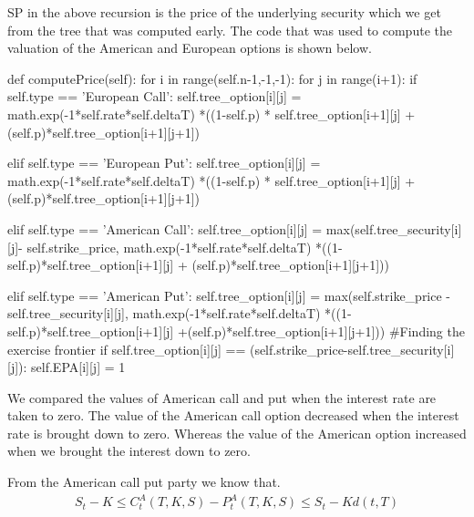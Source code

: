 \documentclass[12pt]{report}
\begin{document}
SP in the above recursion is the price of the underlying security which we get from the tree that was computed early. The code that was used to compute the valuation of the American and European options is shown below.
\begin{tiny}
	\begin{python}

	def computePrice(self):
	 for i in range(self.n-1,-1,-1):
	  for j in range(i+1):
		if self.type == 'European Call':
		 self.tree_option[i][j] = math.exp(-1*self.rate*self.deltaT)
								          *((1-self.p) * self.tree_option[i+1][j] 
								          + (self.p)*self.tree_option[i+1][j+1])
		
		elif self.type == 'European Put':
		 self.tree_option[i][j] = math.exp(-1*self.rate*self.deltaT)
		                      *((1-self.p) * self.tree_option[i+1][j] 
		                       + (self.p)*self.tree_option[i+1][j+1])
		
		elif self.type == 'American Call':
		 self.tree_option[i][j] = max(self.tree_security[i][j]-
		                          self.strike_price,
		                         math.exp(-1*self.rate*self.deltaT)
		                        *((1-self.p)*self.tree_option[i+1][j] 
		                     + (self.p)*self.tree_option[i+1][j+1]))
		
		elif self.type == 'American Put':
		 self.tree_option[i][j] = max(self.strike_price
		                       -self.tree_security[i][j],
		                       math.exp(-1*self.rate*self.deltaT)
		                       *((1-self.p)*self.tree_option[i+1][j]
		                       +(self.p)*self.tree_option[i+1][j+1]))
		 #Finding the exercise frontier
		 if self.tree_option[i][j] == (self.strike_price-self.tree_security[i][j]):
          self.EPA[i][j] = 1
\end{python}
\end{tiny}

We compared the values of American call and put when the interest rate are taken to zero. The value of the American call option decreased when the interest rate is brought down to zero. Whereas the value of the American option increased when we brought the interest down to zero. 

From the American call put party we know that.
\begin{equation*}
	\begin{aligned}
		S_t - K \leq C^A_t(T,K,S) - P^A_t(T,K,S)  \leq S_t - Kd(t,T)
	\end{aligned}
\end{equation*}
\end{document}
